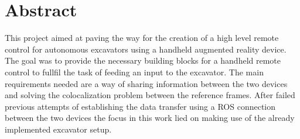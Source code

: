\chapter*{Abstract}


This project aimed at paving the way for the creation of a high level remote control for autonomous excavators using a handheld augmented reality device. The goal was to provide the necessary building blocks for a handheld remote control to fullfil the task of feeding an input to the excavator. The main requirements needed are a way of sharing information between the two devices and solving the colocalization problem between the reference frames. After failed previous attempts of establishing the data transfer using a ROS connection between the two devices the focus in this work lied on making use of the already implemented excavator setup.